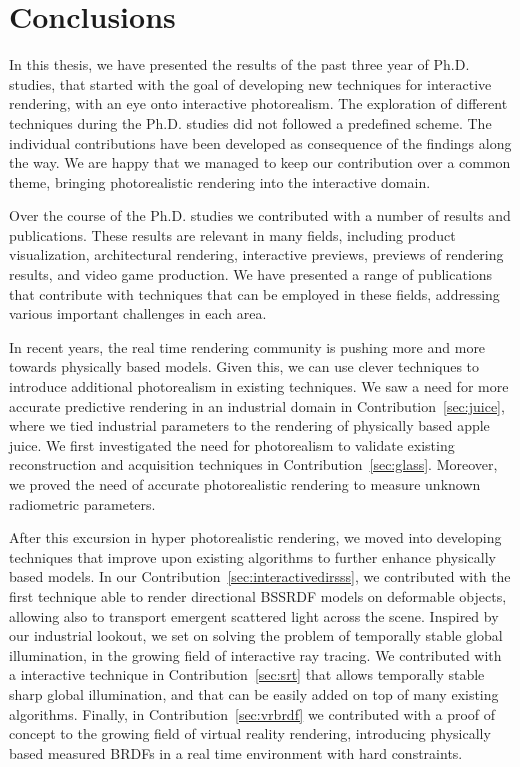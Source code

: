 \chapter{Conclusions}
In this thesis, we have presented the results of the past three year of Ph.D. studies, that started with the goal of developing new techniques for interactive rendering, with an eye onto interactive photorealism. The exploration of different techniques during the Ph.D. studies did not followed a predefined scheme. The individual contributions have been developed as consequence of the findings along the way. We are happy that we managed to keep our contribution over a common theme, bringing photorealistic rendering into the interactive domain.

Over the course of the Ph.D. studies we contributed with a number of results and publications. These results are relevant in many fields, including product visualization, architectural rendering, interactive previews, previews of rendering results, and video game production. We have presented a range of publications that contribute with techniques that can be employed in these fields, addressing various important challenges in each area. 

In recent years, the real time rendering community is pushing more and more towards physically based models. Given this, we can use clever techniques to introduce additional photorealism in existing techniques. We saw a need for more accurate predictive rendering in an industrial domain in Contribution~\ref{sec:juice}, where we tied industrial parameters to the rendering of physically based apple juice. We first investigated the need for photorealism to validate existing reconstruction and acquisition techniques in Contribution~\ref{sec:glass}. Moreover, we proved the need of accurate photorealistic rendering to measure unknown radiometric parameters. 

After this excursion in hyper photorealistic rendering, we moved into developing techniques that improve upon existing algorithms to further enhance physically based models. In our Contribution~\ref{sec:interactivedirsss}, we contributed with the first technique able to render directional BSSRDF models on deformable objects, allowing also to transport emergent scattered light across the scene. Inspired by our industrial lookout, we set on solving the problem of temporally stable global illumination, in the growing field of interactive ray tracing. We contributed with a interactive technique in Contribution~\ref{sec:srt} that allows temporally stable sharp global illumination, and that can be easily added on top of many existing algorithms. Finally, in Contribution~\ref{sec:vrbrdf} we contributed with a proof of concept to the growing field of virtual reality rendering, introducing physically based measured BRDFs in a real time environment with hard constraints.   

